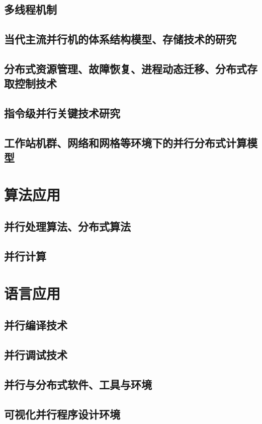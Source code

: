 \subsection{多线程机制}
\subsection{当代主流并行机的体系结构模型、存储技术的研究}
\subsection{分布式资源管理、故障恢复、进程动态迁移、分布式存取控制技术}
\subsection{指令级并行关键技术研究}
\subsection{工作站机群、网络和网格等环境下的并行分布式计算模型}



\section{算法应用}
\subsection{并行处理算法、分布式算法}
\subsection{并行计算}



\section{语言应用}
\subsection{并行编译技术}
\subsection{并行调试技术}
\subsection{并行与分布式软件、工具与环境}
\subsection{可视化并行程序设计环境}

